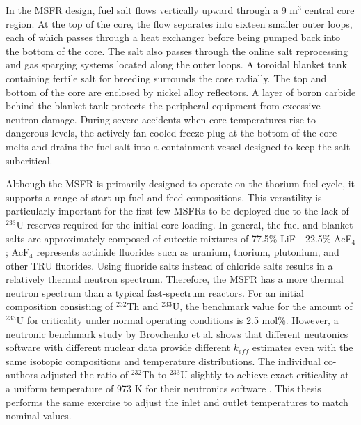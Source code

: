 In the \gls{MSFR} design, fuel salt flows vertically upward through a 9 m$^3$
central core region. At the top of the core, the flow separates into sixteen
smaller outer loops, each of which passes through a heat exchanger before
being pumped back into the bottom of the core. The salt also passes through
the online salt reprocessing and gas sparging systems located along the
outer loops. A toroidal blanket tank containing fertile salt for breeding
surrounds the core radially. The top and bottom of the core are enclosed
by nickel alloy reflectors. A layer of boron carbide behind the blanket tank
protects the peripheral equipment from excessive neutron damage. During severe
accidents when core temperatures rise to dangerous levels, the actively
fan-cooled freeze plug at the bottom of the core melts and drains the fuel
salt into a containment vessel designed to keep the salt subcritical. 

Although the \gls{MSFR} is primarily designed to operate on the thorium fuel
cycle, it supports a range of start-up fuel and feed compositions. This
versatility is particularly important for the first few \glspl{MSFR} to be
deployed due to the lack of $^{233}$U reserves required for the initial core
loading. In general, the fuel and blanket salts are approximately composed of
eutectic mixtures of 77.5\% LiF - 22.5\% AcF$_4$; AcF$_4$ represents
actinide fluorides such as uranium, thorium, plutonium, and other \gls{TRU}
fluorides. Using fluoride salts instead of chloride salts results in a
relatively thermal neutron spectrum. Therefore, the \gls{MSFR} has a more
thermal neutron spectrum than a typical fast-spectrum reactors. For an initial
composition consisting of $^{232}$Th and $^{233}$U,
the benchmark value for the amount of $^{233}$U for criticality under
normal operating conditions is 2.5 mol\%. However, a neutronic benchmark
study by Brovchenko et al. \cite{brovchenko_neutronic_2019} shows that
different neutronics software with different nuclear data provide
different $k_{eff}$ estimates even with the same isotopic compositions and
temperature distributions. The individual co-authors adjusted the
ratio of $^{232}$Th to $^{233}$U slightly to achieve exact criticality at a
uniform temperature of 973 K for their neutronics software
\cite{brovchenko_neutronic_2019}. This thesis
performs the same exercise to adjust the inlet and outlet temperatures to
match nominal values.

